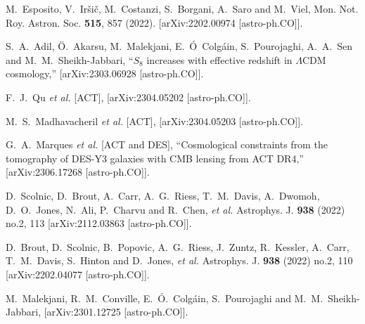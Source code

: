 \documentclass[a4paper,11pt]{article}
\begin{document}
\begin{thebibliography}{99}
M.~Esposito, V.~Ir\v{s}i\v{c}, M.~Costanzi, S.~Borgani, A.~Saro and M.~Viel,
Mon. Not. Roy. Astron. Soc. \textbf{515}, 857  (2022).
[arXiv:2202.00974 [astro-ph.CO]].

S.~A.~Adil, \"O.~Akarsu, M.~Malekjani, E.~\'O~Colg\'ain, S.~Pourojaghi, A.~A.~Sen and M.~M.~Sheikh-Jabbari,
``$S_8$ increases with effective redshift in $\Lambda$CDM cosmology,''
[arXiv:2303.06928 [astro-ph.CO]].

F.~J.~Qu \textit{et al.} [ACT],
[arXiv:2304.05202 [astro-ph.CO]].

M.~S.~Madhavacheril \textit{et al.} [ACT],
[arXiv:2304.05203 [astro-ph.CO]].

G.~A.~Marques \textit{et al.} [ACT and DES],
``Cosmological constraints from the tomography of DES-Y3 galaxies with CMB lensing from ACT DR4,''
[arXiv:2306.17268 [astro-ph.CO]].


D.~Scolnic, D.~Brout, A.~Carr, A.~G.~Riess, T.~M.~Davis, A.~Dwomoh, D.~O.~Jones, N.~Ali, P.~Charvu and R.~Chen, \textit{et al.}
Astrophys. J. \textbf{938} (2022) no.2, 113
[arXiv:2112.03863 [astro-ph.CO]].


D.~Brout, D.~Scolnic, B.~Popovic, A.~G.~Riess, J.~Zuntz, R.~Kessler, A.~Carr, T.~M.~Davis, S.~Hinton and D.~Jones, \textit{et al.}
Astrophys. J. \textbf{938} (2022) no.2, 110
[arXiv:2202.04077 [astro-ph.CO]].


M.~Malekjani, R.~M.~Conville, E.~\'O.~Colg\'ain, S.~Pourojaghi and M.~M.~Sheikh-Jabbari,
[arXiv:2301.12725 [astro-ph.CO]].


\end{thebibliography}
\end{document}
